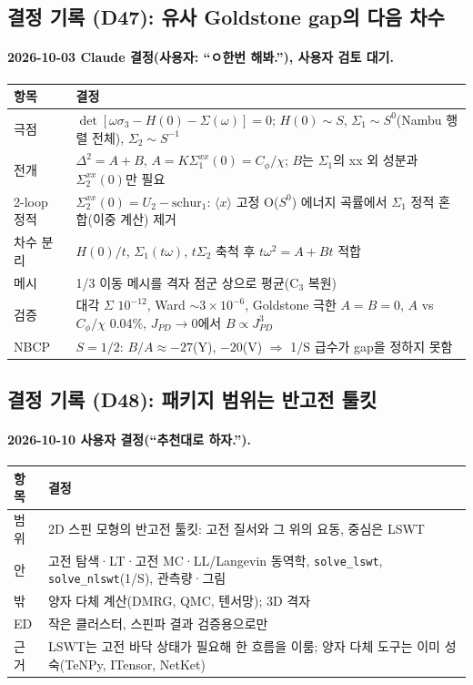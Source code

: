 \subsection{결정 기록 (D47): 유사 Goldstone gap의 다음 차수}\label{decisions-d47-pseudo-goldstone}
\begingroup%
  \framesubtitle{2026-10-03 Claude 결정(사용자: ``ㅇ한번 해봐.''), 사용자 검토 대기.}
  \small\renewcommand{\arraystretch}{1.12}
  \begin{tabularx}{\textwidth}{@{}P{3.0cm}Y@{}}
    \toprule
    항목 & 결정 \\
    \midrule
    극점 & $\det[\omega\sigma_3-H(0)-\Sigma(\omega)]=0$; $H(0)\sim S$, $\Sigma_1\sim S^0$(Nambu 행렬 전체), $\Sigma_2\sim S^{-1}$ \\
    전개 & $\Delta^2=A+B$, $A=K\Sigma_1^{xx}(0)=C_\phi/\chi$; $B$는 $\Sigma_1$의 xx 외 성분과 $\Sigma_2^{xx}(0)$만 필요 \\
    2-loop 정적 & $\Sigma_2^{xx}(0)=U_2-\mathrm{schur}_1$: $\langle x\rangle$ 고정 O($S^0$) 에너지 곡률에서 $\Sigma_1$ 정적 혼합(이중 계산) 제거 \\
    차수 분리 & $H(0)/t$, $\Sigma_1(t\omega)$, $t\Sigma_2$ 축척 후 $t\omega^2=A+Bt$ 적합 \\
    메시 & 1/3 이동 메시를 격자 점군 상으로 평균(C$_3$ 복원) \\
    검증 & 대각 $\Sigma$ $10^{-12}$, Ward $\sim3\times10^{-6}$, Goldstone 극한 $A=B=0$, $A$ vs $C_\phi/\chi$ 0.04\%, $J_{PD}\to0$에서 $B\propto J_{PD}^3$ \\
    NBCP & $S=1/2$: $B/A\approx-27$(Y), $-20$(V) $\Rightarrow$ 1/S 급수가 gap을 정하지 못함 \\
    \bottomrule
  \end{tabularx}
\endgroup


\subsection{결정 기록 (D48): 패키지 범위는 반고전 툴킷}\label{decisions-d48-scope}
\begingroup%
  \framesubtitle{2026-10-10 사용자 결정(``추천대로 하자.'').}
  \small\renewcommand{\arraystretch}{1.12}
  \begin{tabularx}{\textwidth}{@{}P{3.0cm}Y@{}}
    \toprule
    항목 & 결정 \\
    \midrule
    범위 & 2D 스핀 모형의 반고전 툴킷: 고전 질서와 그 위의 요동, 중심은 LSWT \\
    안 & 고전 탐색·LT·고전 MC·LL/Langevin 동역학, \texttt{solve\_lswt}, \texttt{solve\_nlswt}(1/S), 관측량·그림 \\
    밖 & 양자 다체 계산(DMRG, QMC, 텐서망); 3D 격자 \\
    ED & 작은 클러스터, 스핀파 결과 검증용으로만 \\
    근거 & LSWT는 고전 바닥 상태가 필요해 한 흐름을 이룸; 양자 다체 도구는 이미 성숙(TeNPy, ITensor, NetKet) \\
    \bottomrule
  \end{tabularx}
\endgroup


